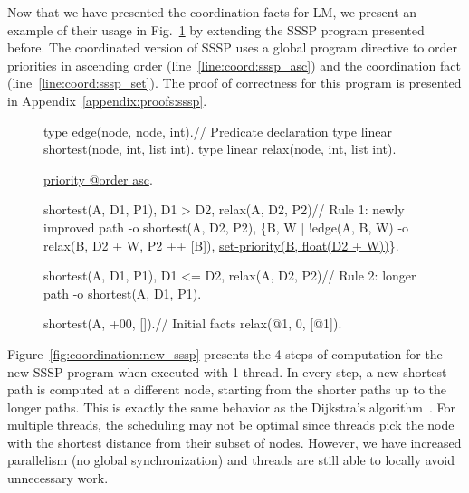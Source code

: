 Now that we have presented the coordination facts for LM, we present
an example of their usage in Fig.~\ref{code:shortest_path_program_coord} by
extending the SSSP program presented before. The coordinated version of SSSP
uses a global program directive to order priorities in ascending order
(line~\ref{line:coord:sssp_asc}) and the coordination fact 
(line~\ref{line:coord:sssp_set}). The proof of correctness for this program is
presented in Appendix~\ref{appendix:proofs:sssp}.

\begin{figure}[ht]
\begin{LineCode}[commandchars=\\\{\}]
type edge(node, node, int).\hfill// Predicate declaration
type linear shortest(node, int, list int).
type linear relax(node, int, list int).

\underline{priority @order asc}.\label{line:coord:sssp_asc}

shortest(A, D1, P1), D1 > D2, relax(A, D2, P2)\hfill// Rule 1: newly improved path\label{line:coord:ssspfirst1}
   -o shortest(A, D2, P2),
      \{B, W | !edge(A, B, W) -o
         relax(B, D2 + W, P2 ++ [B]),
         \underline{set-priority(B, float(D2 + W))}\}.\label{line:coord:sssp_set}\label{line:coord:ssspfirst2}

shortest(A, D1, P1), D1 <= D2, relax(A, D2, P2)\hfill// Rule 2: longer path\label{line:coord:ssspsecond1}
   -o shortest(A, D1, P1).\label{line:coord:ssspsecond2}

shortest(A, +00, []).\hfill// Initial facts
relax(@1, 0, [@1]).
\end{LineCode}
   \label{code:shortest_path_program_coord}
\end{figure}

Figure~\ref{fig:coordination:new_sssp} presents the 4 steps of computation for
the new SSSP program when executed with 1 thread. In every step, a new shortest
path is computed at a different node, starting from the shorter paths up to the
longer paths. This is exactly the same behavior as the Dijkstra's
algorithm~\cite{Dijkstra}.  For multiple threads, the scheduling may not be
optimal since threads pick the node with the shortest distance from their subset
of nodes. However, we have increased parallelism (no global synchronization)
and threads are still able to locally avoid unnecessary work.

